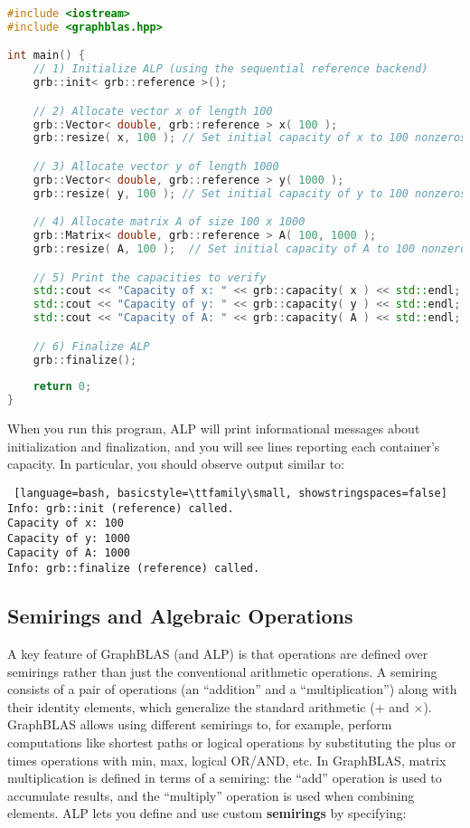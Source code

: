 \begin{lstlisting}[language=C++,basicstyle=\ttfamily\small, showstringspaces=false]
#include <iostream>
#include <graphblas.hpp>

int main() {
    // 1) Initialize ALP (using the sequential reference backend)
    grb::init< grb::reference >();

    // 2) Allocate vector x of length 100
    grb::Vector< double, grb::reference > x( 100 );
    grb::resize( x, 100 ); // Set initial capacity of x to 100 nonzeros

    // 3) Allocate vector y of length 1000
    grb::Vector< double, grb::reference > y( 1000 );
    grb::resize( y, 100 ); // Set initial capacity of y to 100 nonzeros

    // 4) Allocate matrix A of size 100 x 1000
    grb::Matrix< double, grb::reference > A( 100, 1000 );
    grb::resize( A, 100 );  // Set initial capacity of A to 100 nonzeros

    // 5) Print the capacities to verify
    std::cout << "Capacity of x: " << grb::capacity( x ) << std::endl;
    std::cout << "Capacity of y: " << grb::capacity( y ) << std::endl;
    std::cout << "Capacity of A: " << grb::capacity( A ) << std::endl;

    // 6) Finalize ALP
    grb::finalize();
    
    return 0;
}
\end{lstlisting}

When you run this program, ALP will print informational messages about initialization and finalization, and you will see lines reporting each container’s capacity. In particular, you should observe output similar to:

\begin{lstlisting} [language=bash, basicstyle=\ttfamily\small, showstringspaces=false]
Info: grb::init (reference) called.
Capacity of x: 100
Capacity of y: 1000
Capacity of A: 1000
Info: grb::finalize (reference) called.
\end{lstlisting}

\subsection{Semirings and Algebraic Operations}

A key feature of GraphBLAS (and ALP) is that operations are defined over semirings rather than just the conventional arithmetic operations. A semiring consists of a pair of operations (an “addition” and a “multiplication”) along with their identity elements, which generalize the standard arithmetic (+ and $\times$). GraphBLAS allows using different semirings to, for example, perform computations like shortest paths or logical operations by substituting the plus or times operations with min, max, logical OR/AND, etc. In GraphBLAS, matrix multiplication is defined in terms of a semiring: the “add” operation is used to accumulate results, and the “multiply” operation is used when combining elements.
ALP lets you define and use custom \textbf{semirings} by specifying:


